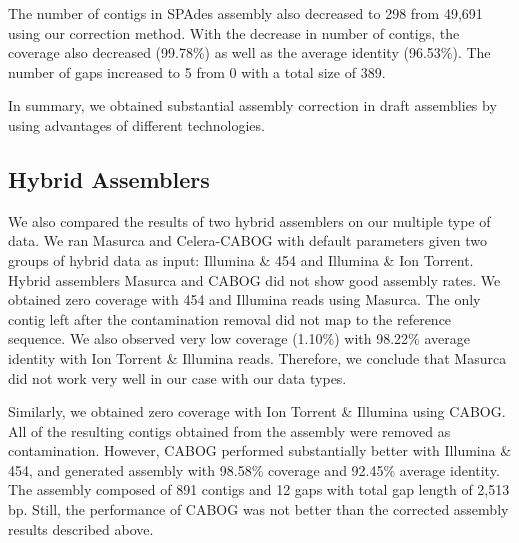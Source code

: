 \documentclass{llncs}
\begin{document}
The number of contigs in SPAdes assembly also decreased to 298 from 49,691 using our correction method. With the decrease in number of contigs, the coverage also decreased (99.78\%) as well as the average identity (96.53\%). The number of gaps increased to 5 from 0 with a total size of 389.

In summary, we obtained substantial assembly correction in draft assemblies by using advantages of different technologies.

\subsection{Hybrid Assemblers}
\label{hyb}

We also compared the results of two hybrid assemblers on our multiple type of data. We ran Masurca and Celera-CABOG with default parameters given two groups of hybrid data as input: Illumina \& 454 and Illumina \& Ion Torrent. Hybrid assemblers Masurca and CABOG did not show good assembly rates.
We obtained zero coverage with 454 and Illumina reads using Masurca. The only contig left after the contamination removal did not map to the reference sequence. We also observed very low coverage (1.10\%) with 98.22\% average identity  with Ion Torrent \& Illumina reads. Therefore, we conclude that Masurca did not work very well in our case with our data types. 

Similarly, we obtained zero coverage with Ion Torrent \& Illumina using CABOG. All of the resulting contigs obtained from the assembly were removed as contamination. However, CABOG performed substantially better with
Illumina \& 454, and generated assembly with 98.58\% coverage and 92.45\% average identity.
The assembly composed of 891 contigs and 12 gaps with total gap length of 2,513 bp. Still, 
the performance of CABOG was not better than the corrected assembly results described above.
\end{document}
